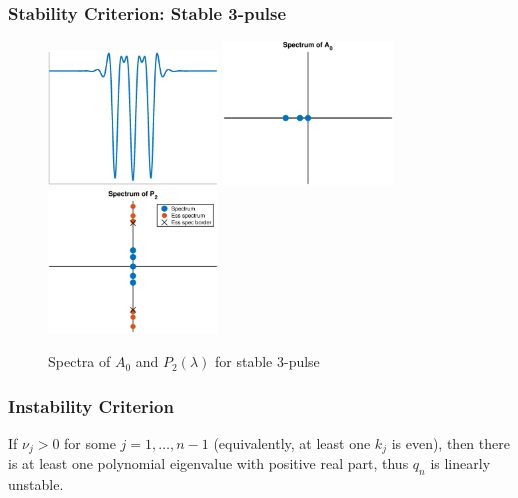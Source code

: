 \documentclass[16pt]{beamer}
\begin{document}
\begin{frame}
\frametitle{Stability Criterion: Stable 3-pulse}
\begin{figure}
\begin{center}
\includegraphics[width=4.5cm]{images/stable2.eps}
\includegraphics[width=4.5cm]{images/stable2A0.eps}
\includegraphics[width=4.5cm]{images/stable2spec.eps}
\caption{Spectra of $A_0$ and $P_2(\lambda)$ for stable 3-pulse}
\end{center}
\end{figure}
\end{frame}

\begin{frame}
\frametitle{Instability Criterion}
\begin{corollary}[Kapitula et. al., 2019]If $\nu_j > 0$ for some $j = 1, \dots, n-1$ (equivalently, at least one $k_j$ is even), then there is at least one polynomial eigenvalue with positive real part, thus $q_n$ is linearly unstable.
\end{corollary}
\end{frame}
\end{document}
